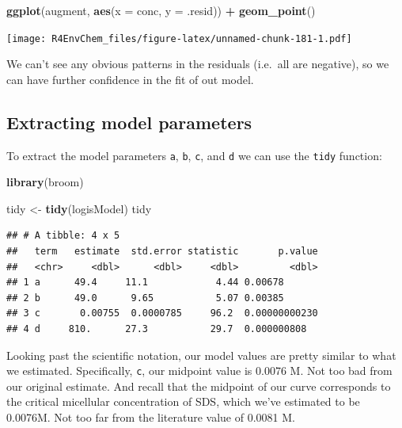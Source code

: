 \documentclass[
]{book}
\newenvironment{Shaded}{\begin{snugshade}}{\end{snugshade}}
\newcommand{\AttributeTok}[1]{\textcolor[rgb]{0.13,0.29,0.53}{#1}}
\newcommand{\FunctionTok}[1]{\textcolor[rgb]{0.13,0.29,0.53}{\textbf{#1}}}
\newcommand{\NormalTok}[1]{#1}
\newcommand{\OtherTok}[1]{\textcolor[rgb]{0.56,0.35,0.01}{#1}}
\newcommand{\SpecialCharTok}[1]{\textcolor[rgb]{0.81,0.36,0.00}{\textbf{#1}}}
\begin{document}
\begin{Shaded}
\begin{Highlighting}[]
\FunctionTok{ggplot}\NormalTok{(augment, }\FunctionTok{aes}\NormalTok{(}\AttributeTok{x =}\NormalTok{ conc, }\AttributeTok{y =}\NormalTok{ .resid)) }\SpecialCharTok{+}
  \FunctionTok{geom\_point}\NormalTok{() }
\end{Highlighting}
\end{Shaded}

\texttt{[image: R4EnvChem\_files/figure-latex/unnamed-chunk-181-1.pdf]}

We can't see any obvious patterns in the residuals (i.e.~all are negative), so we can have further confidence in the fit of out model.

\hypertarget{extracting-model-parameters}{%
\subsection{Extracting model parameters}\label{extracting-model-parameters}}

To extract the model parameters \texttt{a}, \texttt{b}, \texttt{c}, and \texttt{d} we can use the \texttt{tidy} function:

\begin{Shaded}
\begin{Highlighting}[]
\FunctionTok{library}\NormalTok{(broom)}

\NormalTok{tidy }\OtherTok{\textless{}{-}} \FunctionTok{tidy}\NormalTok{(logisModel)}
\NormalTok{tidy}
\end{Highlighting}
\end{Shaded}

\begin{verbatim}
## # A tibble: 4 x 5
##   term   estimate  std.error statistic       p.value
##   <chr>     <dbl>      <dbl>     <dbl>         <dbl>
## 1 a      49.4     11.1            4.44 0.00678      
## 2 b      49.0      9.65           5.07 0.00385      
## 3 c       0.00755  0.0000785     96.2  0.00000000230
## 4 d     810.      27.3           29.7  0.000000808
\end{verbatim}

Looking past the scientific notation, our model values are pretty similar to what we estimated. Specifically, \texttt{c}, our midpoint value is 0.0076 M. Not too bad from our original estimate. And recall that the midpoint of our curve corresponds to the critical micellular concentration of SDS, which we've estimated to be 0.0076M. Not too far from the literature value of 0.0081 M.
\end{document}
